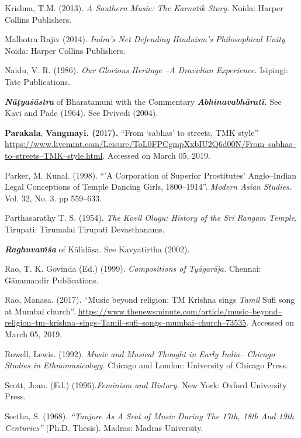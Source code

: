 \begin{thebibliography}{99}
  Krishna, T.M. (2013). \textit{A Southern Music: The Karnatik Story. }Noida: Harper Collins Publishers.

  Malhotra Rajiv (2014). \textit{Indra’s Net Defending Hinduism’s Philosophical Unity }Noida: Harper Collins Publishers.

  Naidu, V. R. (1986). \textit{Our Glorious Heritage –A Dravidian Experience. }Isipingi: Tate Publications.

  \textbf{\textit{Nāṭyaśāstra}} of Bharatamuni with the Commentary \textbf{\textit{Abhinavabhāratī.}} See Kavi and Pade (1964). See Dvivedi (2004).

  \textbf{Parakala}, \textbf{Vangmayi. (}2017\textbf{). }“From ‘sabhas’ to streets, TMK style” \url{https://www.livemint.com/Leisure/ToL0FPCgmpXxbIU2Q6d00N/From–sabhas–to–streets–TMK–style.html}. Accessed on March 05, 2019.

  Parker, M. Kunal. (1998). “'A Corporation of Superior Prostitutes' Anglo–Indian Legal Conceptions of Temple Dancing Girls, 1800–1914”. \textit{Modern Asian Studies}. Vol. 32, No. 3. pp 559–633.

  Parthasarathy T. S. (1954). \textit{The Kovil Olugu: History of the Sri Rangam Temple}. Tirupati: Tirumalai Tirupati Devasthanams.

  \textit{\textbf{Raghuvaṁśa}} of Kālidāsa. See Kavyatirtha (2002).

  Rao, T. K. Govinda (Ed.) (1999). \textit{Compositions of Tyāgarāja. }Chennai: Gānamandir Publications.

  Rao, Manasa. (2017). “Music beyond religion: TM Krishna sings \textit{Tamil} Sufi song at Mumbai church”. \url{https://www.thenewsminute.com/article/music–beyond–religion–tm–krishna–sings–Tamil–sufi–songs–mumbai–church–73535}. Accessed on March 05, 2019.

  Rowell, Lewis. (1992). \textit{Music and Musical Thought in Early India– Chicago Studies in Ethnomusicology.} Chicago and London: University of Chicago Press.

  Scott, Joan. (Ed.) (1996).\textit{Feminism and History. }New York: Oxford University Press.

  Seetha, S. (1968). \textit{“Tanjore As A Seat of Music During The 17th, 18th And 19th Centuries” }(Ph.D. Thesis). Madras: Madras University.


\end{thebibliography}
